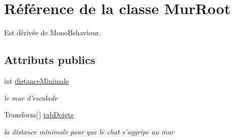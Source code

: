 \hypertarget{class_mur_root}{\section{Référence de la classe Mur\+Root}
\label{class_mur_root}
}


Est dérivée de Mono\+Behaviour.

\subsection*{Attributs publics}
\begin{DoxyCompactItemize}
\item 
\hypertarget{class_mur_root_aaafa455395ac8213a7c3ae1f45b8e298}{int \hyperlink{class_mur_root_aaafa455395ac8213a7c3ae1f45b8e298}{distance\+Minimale}}\label{class_mur_root_aaafa455395ac8213a7c3ae1f45b8e298}

\begin{DoxyCompactList}\small\item\em le mur d'escalade \end{DoxyCompactList}\item 
\hypertarget{class_mur_root_a54fd5da637c72c9e6245da883c6bb30d}{Transform\mbox{[}$\,$\mbox{]} \hyperlink{class_mur_root_a54fd5da637c72c9e6245da883c6bb30d}{tab\+Doigts}}\label{class_mur_root_a54fd5da637c72c9e6245da883c6bb30d}

\begin{DoxyCompactList}\small\item\em la distance minimale pour que le chat s'aggripe au mur \end{DoxyCompactList}\end{DoxyCompactItemize}
